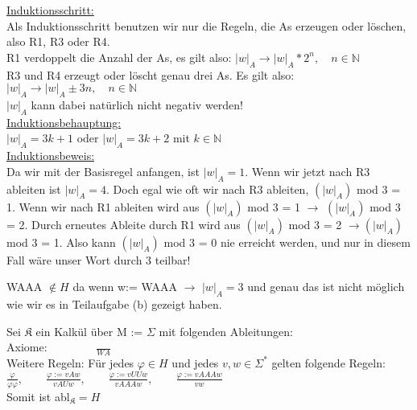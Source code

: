 \documentclass[a4paper,10pt]{article}
\begin{document}
\begin{compactenum} [(a)]
		\underline{Induktionsschritt:}\\
		Als Induktionsschritt benutzen wir nur die Regeln, die As erzeugen oder löschen, also R1, R3 oder R4. \\
		R1 verdoppelt die Anzahl der As, es gilt also: $ |w|_A \longrightarrow |w|_A * 2^n, \quad n \in \mathbb{N}$\\
		R3 und R4 erzeugt oder löscht genau drei As. Es gilt also:  $ |w|_A \longrightarrow |w|_A \pm 3n, \quad n \in \mathbb{N}$\\
		$ |w|_A $ kann dabei natürlich nicht negativ werden!\\

		\underline{Induktionsbehauptung:} \\
		$ |w|_A = 3k+1$ oder $ |w|_A = 3k+2$ mit $ k \in \mathbb{N} $\\
		
		\underline{Induktionsbeweis:}\\
		Da wir mit der Basisregel anfangen, ist  $ |w|_A = 1 $. Wenn wir jetzt nach R3 ableiten ist $ |w|_A = 4 $. Doch egal wie oft wir nach R3 ableiten, $ (|w|_A)$ mod 3 = 1. Wenn wir nach R1 ableiten wird aus $ (|w|_A)$ mod 3 = 1 $ \longrightarrow $ $ (|w|_A)$ mod 3 = 2. Durch erneutes Ableite durch R1 wird aus $(|w|_A)$ mod 3 = 2 $ \longrightarrow (|w|_A)$ mod 3 = 1. Also kann $(|w|_A)$ mod 3 = 0 nie erreicht werden, und nur in diesem Fall wäre unser Wort durch 3 teilbar!\\
		
	\item WAAA $ \not\in H $ da wenn w:= WAAA $ \rightarrow $ $ |w|_A = 3 $ und genau das ist nicht möglich wie wir es in Teilaufgabe (b) gezeigt haben.\\
	
	\item Sei $ \mathfrak{K} $ ein Kalkül über M := $ \Sigma $ mit folgenden Ableitungen:\\
	Axiome: $ \qquad \qquad \frac{}{WA} $\\
	
	Weitere Regeln: Für jedes $ \varphi \in H $ und jedes $ v,w \in \Sigma^* $ gelten folgende Regeln:\\
	
	$ \frac{\varphi}{\varphi \varphi},\qquad \frac{\varphi:= vAw}{vAUw},\qquad \frac{\varphi:=vUUw}{vAAAw},\qquad \frac{\varphi:= vAAAw}{vw} $\\
	
	Somit ist abl$_\mathfrak{K} = H$
	\end{compactenum}
	
\end{document}
